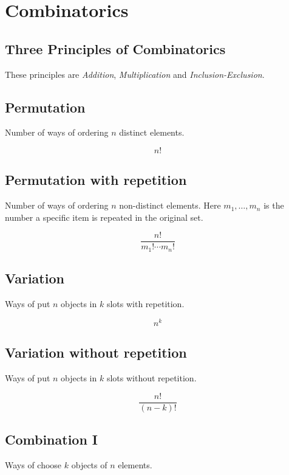 \newpage
\section{Combinatorics}

\subsection{Three Principles of Combinatorics}

These principles are \emph{Addition}, \emph{Multiplication} and \emph{Inclusion-Exclusion}.

\subsection{Permutation}

Number of ways of ordering \(n\) distinct elements.

\[
    n!
\]

\subsection{Permutation with repetition}

Number of ways of ordering \(n\) non-distinct elements. Here \(m_1, \dots, m_n\)
is the number a specific item is repeated in the original set.

\[
    \frac{n!}{m_1! \cdots m_n!}
\]

\subsection{Variation}

Ways of put \(n\) objects in \(k\) slots with repetition.

\[
    n^k
\]

\subsection{Variation without repetition}

Ways of put \(n\) objects in \(k\) slots without repetition.

\[
    \frac{n!}{(n -k)!}
\]

\subsection{Combination I}

Ways of choose \(k\) objects of \(n\) elements.

